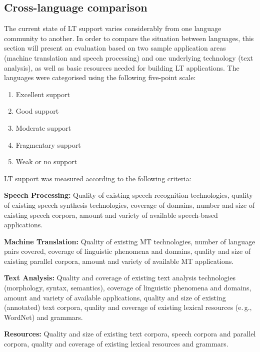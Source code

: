 \documentclass[]{../../metanetpaper}
\begin{document}
\begin{multicols}{2}
\subsection{Cross-language comparison}

The current state of LT support varies considerably from one language community to another. In order to compare the situation between languages, this section will present an evaluation based on two sample application areas (machine translation and speech processing) and one underlying technology (text analysis), as well as basic resources needed for building LT applications. The languages were categorised using the following five-point scale: 

\begin{enumerate}
\item Excellent support
\item Good support
\item Moderate support
\item Fragmentary support
\item Weak or no support
\end{enumerate}

LT support was measured according to the following criteria:

\textbf{Speech Processing:} Quality of existing speech recognition technologies, quality of existing speech synthesis technologies, coverage of domains, number and size of existing speech corpora, amount and variety of available speech-based applications.

\textbf{Machine Translation:} Quality of existing MT technologies, number of language pairs covered, coverage of linguistic phenomena and domains, quality and size of existing parallel corpora, amount and variety of available MT applications.

\textbf{Text Analysis:} Quality and coverage of existing text analysis technologies (morphology, syntax, semantics), coverage of linguistic phenomena and domains, amount and variety of available applications, quality and size of existing (annotated) text corpora, quality and coverage of existing lexical resources (e.\,g., WordNet) and grammars.

\textbf{Resources:} Quality and size of existing text corpora, speech corpora and parallel corpora, quality and coverage of existing lexical resources and grammars.


\end{multicols}
\end{document}
